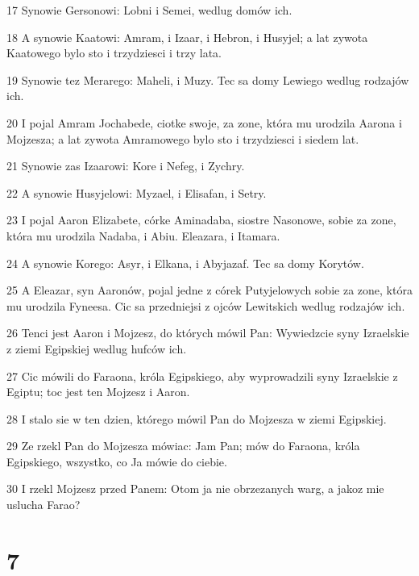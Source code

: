 \par 17 Synowie Gersonowi: Lobni i Semei, wedlug domów ich.
\par 18 A synowie Kaatowi: Amram, i Izaar, i Hebron, i Husyjel; a lat zywota Kaatowego bylo sto i trzydziesci i trzy lata.
\par 19 Synowie tez Merarego: Maheli, i Muzy. Tec sa domy Lewiego wedlug rodzajów ich.
\par 20 I pojal Amram Jochabede, ciotke swoje, za zone, która mu urodzila Aarona i Mojzesza; a lat zywota Amramowego bylo sto i trzydziesci i siedem lat.
\par 21 Synowie zas Izaarowi: Kore i Nefeg, i Zychry.
\par 22 A synowie Husyjelowi: Myzael, i Elisafan, i Setry.
\par 23 I pojal Aaron Elizabete, córke Aminadaba, siostre Nasonowe, sobie za zone, która mu urodzila Nadaba, i Abiu. Eleazara, i Itamara.
\par 24 A synowie Korego: Asyr, i Elkana, i Abyjazaf. Tec sa domy Korytów.
\par 25 A Eleazar, syn Aaronów, pojal jedne z córek Putyjelowych sobie za zone, która mu urodzila Fyneesa. Cic sa przedniejsi z ojców Lewitskich wedlug rodzajów ich.
\par 26 Tenci jest Aaron i Mojzesz, do których mówil Pan: Wywiedzcie syny Izraelskie z ziemi Egipskiej wedlug hufców ich.
\par 27 Cic mówili do Faraona, króla Egipskiego, aby wyprowadzili syny Izraelskie z Egiptu; toc jest ten Mojzesz i Aaron.
\par 28 I stalo sie w ten dzien, którego mówil Pan do Mojzesza w ziemi Egipskiej.
\par 29 Ze rzekl Pan do Mojzesza mówiac: Jam Pan; mów do Faraona, króla Egipskiego, wszystko, co Ja mówie do ciebie.
\par 30 I rzekl Mojzesz przed Panem: Otom ja nie obrzezanych warg, a jakoz mie uslucha Farao?

\chapter{7}

